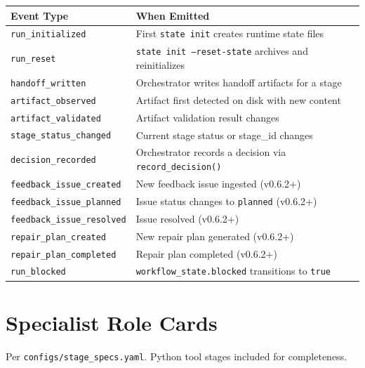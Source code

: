 \documentclass[11pt,a4paper]{article}
\begin{document}
\begin{table}[ht]
\centering
\footnotesize
\begin{tabular}{@{}ll@{}}
\toprule
\textbf{Event Type} & \textbf{When Emitted} \\
\midrule
\texttt{run\_initialized} & First \texttt{state init} creates runtime state files \\
\texttt{run\_reset} & \texttt{state init --reset-state} archives and reinitializes \\
\texttt{handoff\_written} & Orchestrator writes handoff artifacts for a stage \\
\texttt{artifact\_observed} & Artifact first detected on disk with new content \\
\texttt{artifact\_validated} & Artifact validation result changes \\
\texttt{stage\_status\_changed} & Current stage status or stage\_id changes \\
\texttt{decision\_recorded} & Orchestrator records a decision via \texttt{record\_decision()} \\
\texttt{feedback\_issue\_created} & New feedback issue ingested (v0.6.2+) \\
\texttt{feedback\_issue\_planned} & Issue status changes to \texttt{planned} (v0.6.2+) \\
\texttt{feedback\_issue\_resolved} & Issue resolved (v0.6.2+) \\
\texttt{repair\_plan\_created} & New repair plan generated (v0.6.2+) \\
\texttt{repair\_plan\_completed} & Repair plan completed (v0.6.2+) \\
\texttt{run\_blocked} & \texttt{workflow\_state.blocked} transitions to \texttt{true} \\
\bottomrule
\end{tabular}
\end{table}

\section{Specialist Role Cards}

Per \texttt{configs/stage\_specs.yaml}. Python tool stages included for completeness.
\end{document}
